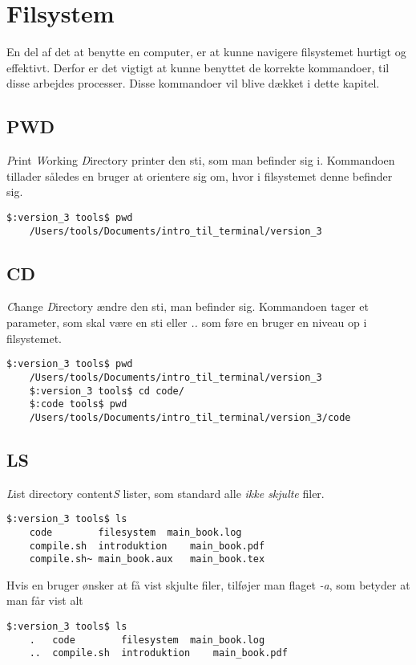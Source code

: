 \chapter{Filsystem}
En del af det at benytte en computer, er at kunne navigere filsystemet hurtigt og effektivt. 
Derfor er det vigtigt at kunne benyttet de korrekte kommandoer, til disse arbejdes processer. 
Disse kommandoer vil blive dækket i dette kapitel.
\section{PWD}
\emph{P}rint \emph{W}orking \emph{D}irectory printer den sti, som man befinder sig i. Kommandoen tillader således en bruger at orientere sig om, hvor i filsystemet denne befinder sig.
\begin{lstlisting}[title=pwd eksempel]
	$:version_3 tools$ pwd
	/Users/tools/Documents/intro_til_terminal/version_3
\end{lstlisting}
\section{CD}
\emph{C}hange \emph{D}irectory ændre den sti, man befinder sig. Kommandoen tager et parameter, som skal være en sti eller \emph{..} som føre en bruger en niveau op i filsystemet. 
\begin{lstlisting}[title=cd eksempel]
	$:version_3 tools$ pwd
	/Users/tools/Documents/intro_til_terminal/version_3
	$:version_3 tools$ cd code/
	$:code tools$ pwd
	/Users/tools/Documents/intro_til_terminal/version_3/code
\end{lstlisting}
\section{LS}
\emph{L}ist directory content\emph{S} lister, som standard alle \textit{ikke skjulte} filer.
\begin{lstlisting}[title=ls eksempel]
	$:version_3 tools$ ls
	code		filesystem	main_book.log	
	compile.sh	introduktion	main_book.pdf	
	compile.sh~	main_book.aux	main_book.tex	
\end{lstlisting}
Hvis en bruger ønsker at få vist skjulte filer, tilføjer man flaget \textit{-a}, som betyder at 
man får vist alt
\begin{lstlisting}[title=ls -a eksempel]
	$:version_3 tools$ ls
	.	code		filesystem	main_book.log	
	..	compile.sh	introduktion	main_book.pdf	
\end{lstlisting}

